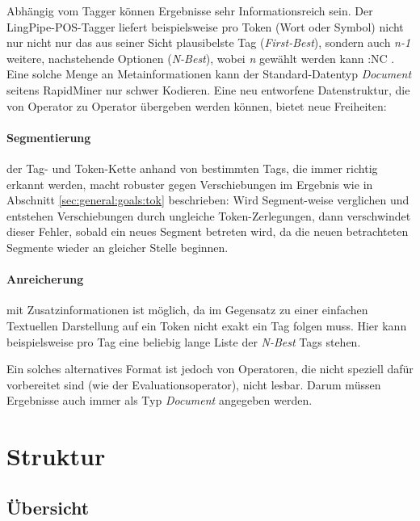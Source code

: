 Abhängig vom Tagger können Ergebnisse sehr Informationsreich sein. Der LingPipe-POS-Tagger liefert beispielsweise pro Token (Wort oder Symbol) nicht nur nicht nur das aus seiner Sicht plausibelste Tag (\textit{First-Best}), sondern auch \textit{n-1} weitere, nachstehende Optionen (\textit{N-Best}), wobei \textit{n} gewählt werden kann :NC . Eine solche Menge an Metainformationen kann der Standard-Datentyp \textit{Document} seitens RapidMiner nur schwer Kodieren. Eine neu entworfene Datenstruktur, die von Operator zu Operator übergeben werden können, bietet neue Freiheiten:

\paragraph{Segmentierung} der Tag- und Token-Kette anhand von bestimmten Tags, die immer richtig erkannt werden, macht robuster gegen Verschiebungen im Ergebnis wie in Abschnitt \ref{sec:general:goals:tok} beschrieben: Wird Segment-weise verglichen und entstehen Verschiebungen durch ungleiche Token-Zerlegungen, dann verschwindet dieser Fehler, sobald ein neues Segment betreten wird, da die neuen betrachteten Segmente wieder an gleicher Stelle beginnen.
\paragraph{Anreicherung} mit Zusatzinformationen ist möglich, da im Gegensatz zu einer einfachen Textuellen Darstellung auf ein Token nicht exakt ein Tag folgen muss. Hier kann beispielsweise pro Tag eine beliebig lange Liste der \textit{N-Best} Tags stehen.

Ein solches alternatives Format ist jedoch von Operatoren, die nicht speziell dafür vorbereitet sind (wie der Evaluationsoperator), nicht lesbar. Darum müssen Ergebnisse auch immer als Typ \textit{Document} angegeben werden.

\section{Struktur}
\label{sec:impl:structure}

\subsection{Übersicht}
\label{sec:impl:structure:overview}

